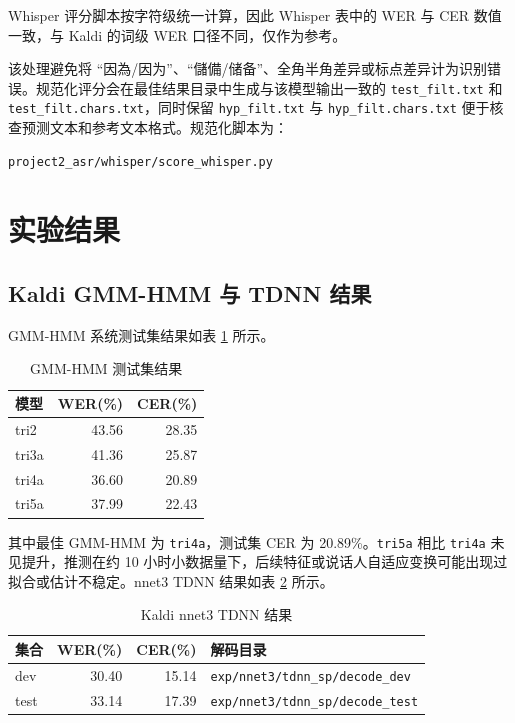 \documentclass[UTF8,a4paper,12pt]{ctexart}
\begin{document}
Whisper 评分脚本按字符级统一计算，因此 Whisper 表中的 WER 与 CER 数值一致，与 Kaldi 的词级 WER 口径不同，仅作为参考。

该处理避免将 ``因為/因为''、``儲備/储备''、全角半角差异或标点差异计为识别错误。规范化评分会在最佳结果目录中生成与该模型输出一致的 \texttt{test_filt.txt} 和 \texttt{test_filt.chars.txt}，同时保留 \texttt{hyp_filt.txt} 与 \texttt{hyp_filt.chars.txt} 便于核查预测文本和参考文本格式。规范化脚本为：

\begin{lstlisting}
project2_asr/whisper/score_whisper.py
\end{lstlisting}

\section{实验结果}

\subsection{Kaldi GMM-HMM 与 TDNN 结果}

GMM-HMM 系统测试集结果如表 \ref{tab:gmm-results} 所示。

\begin{table}[htbp]
  \centering
  \caption{GMM-HMM 测试集结果}
  \label{tab:gmm-results}
  \begin{tabular}{lrr}
    \toprule
    模型 & WER(\%) & CER(\%) \\
    \midrule
    tri2 & 43.56 & 28.35 \\
    tri3a & 41.36 & 25.87 \\
    tri4a & 36.60 & 20.89 \\
    tri5a & 37.99 & 22.43 \\
    \bottomrule
  \end{tabular}
\end{table}

其中最佳 GMM-HMM 为 \texttt{tri4a}，测试集 CER 为 20.89\%。\texttt{tri5a} 相比 \texttt{tri4a} 未见提升，推测在约 10 小时小数据量下，后续特征或说话人自适应变换可能出现过拟合或估计不稳定。nnet3 TDNN 结果如表 \ref{tab:tdnn-results} 所示。

\begin{table}[htbp]
  \centering
  \caption{Kaldi nnet3 TDNN 结果}
  \label{tab:tdnn-results}
  \begin{tabular}{lrrl}
    \toprule
    集合 & WER(\%) & CER(\%) & 解码目录 \\
    \midrule
    dev & 30.40 & 15.14 & \texttt{exp/nnet3/tdnn\_sp/decode\_dev} \\
    test & 33.14 & 17.39 & \texttt{exp/nnet3/tdnn\_sp/decode\_test} \\
    \bottomrule
  \end{tabular}
\end{table}
\end{document}

